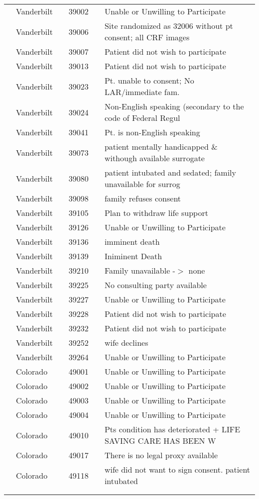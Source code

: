 \documentclass[dvips,10pt]{article}
\begin{document}
\begin{table}[t]
\begin{center}
\begin{tabular}{ @{}l@{}
@{}l@{}@{}p{1.5em}@{}@{}c@{}@{}p{1.5em}@{}@{}l@{}
}
\\
& Vanderbilt && 39002 && Unable or Unwilling to Participate \\
& Vanderbilt && 39006 && Site randomized as 32006 without pt consent; all CRF images \\
& Vanderbilt && 39007 && Patient did not wish to participate \\
& Vanderbilt && 39013 && Patient did not wish to participate \\
& Vanderbilt && 39023 && Pt. unable to consent; No LAR/immediate fam. \\
& Vanderbilt && 39024 && Non-English speaking (secondary to the code of Federal Regul \\
& Vanderbilt && 39041 && Pt. is non-English speaking \\
& Vanderbilt && 39073 && patient mentally handicapped \& withough available surrogate \\
& Vanderbilt && 39080 && patient intubated and sedated; family unavailable for surrog \\
& Vanderbilt && 39098 && family refuses consent \\
& Vanderbilt && 39105 && Plan to withdraw life support \\
& Vanderbilt && 39126 && Unable or Unwilling to Participate \\
& Vanderbilt && 39136 && imminent death \\
& Vanderbilt && 39139 && Iniminent Death \\
& Vanderbilt && 39210 && Family unavailable -$>$ none \\
& Vanderbilt && 39225 && No consulting party available \\
& Vanderbilt && 39227 && Unable or Unwilling to Participate \\
& Vanderbilt && 39228 && Patient did not wish to participate \\
& Vanderbilt && 39232 && Patient did not wish to participate \\
& Vanderbilt && 39252 && wife declines \\
& Vanderbilt && 39264 && Unable or Unwilling to Participate \\
& Colorado && 49001 && Unable or Unwilling to Participate \\
& Colorado && 49002 && Unable or Unwilling to Participate \\
& Colorado && 49003 && Unable or Unwilling to Participate \\
& Colorado && 49004 && Unable or Unwilling to Participate \\
& Colorado && 49010 && Pts condition has deteriorated + LIFE SAVING CARE HAS BEEN W \\
& Colorado && 49017 && There is no legal proxy available \\
& Colorado && 49118 && wife did not want to sign consent. patient intubated \\
\\
\hline \\


\end{tabular}
\end{center}
\end{table}
\end{document}
